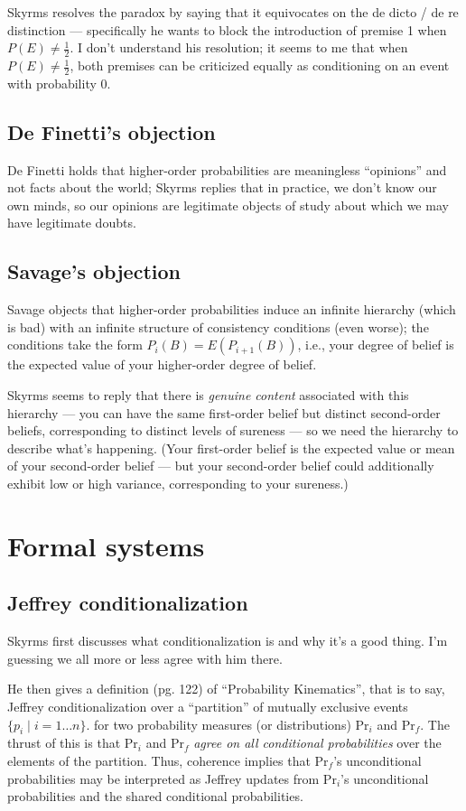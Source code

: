\documentclass[letterpaper,12pt]{article}
\newcommand{\Prob}{\text{Pr}}
\begin{document}
Skyrms resolves the paradox by saying that it equivocates on the de dicto / de re distinction --- specifically he wants to block the introduction of premise 1 when $P(E) \not = \frac{1}{2}$. I don't understand his resolution; it seems to me that when $P(E) \not = \frac{1}{2}$, both premises can be criticized equally as conditioning on an event with probability $0$.
\subsection{De Finetti's objection}
De Finetti holds that higher-order probabilities are meaningless ``opinions'' and not facts about the world; Skyrms replies that in practice, we don't know our own minds, so our opinions are legitimate objects of study about which we may have legitimate doubts.
\subsection{Savage's objection}
Savage objects that higher-order probabilities induce an infinite hierarchy (which is bad) with an infinite structure of consistency conditions (even worse); the conditions take the form $P_i(B) = E(P_{i+1}(B))$, i.e., your degree of belief is the expected value of your higher-order degree of belief.

Skyrms seems to reply that there is \emph{genuine content} associated with this hierarchy --- you can have the same first-order belief but distinct second-order beliefs, corresponding to distinct levels of sureness --- so we need the hierarchy to describe what's happening. (Your first-order belief is the expected value or mean of your second-order belief --- but your second-order belief could additionally exhibit low or high variance, corresponding to your sureness.)

\section{Formal systems}
\subsection{Jeffrey conditionalization}
Skyrms first discusses what conditionalization is and why it's a good thing. I'm guessing we all more or less agree with him there.

He then gives a definition (pg. 122) of ``Probability Kinematics'', that is to say, Jeffrey conditionalization over a ``partition'' of mutually exclusive events $\{p_i \mid i = 1 \ldots n \}$. for two probability measures (or distributions) $\Prob_i$ and $\Prob_f$. The thrust of this is that $\Prob_i$ and $\Prob_f$ \emph{agree on all conditional probabilities} over the elements of the partition. Thus, coherence implies that $\Prob_f$'s unconditional probabilities may be interpreted as Jeffrey updates from $\Prob_i$'s unconditional probabilities and the shared conditional probabilities.
\end{document}
